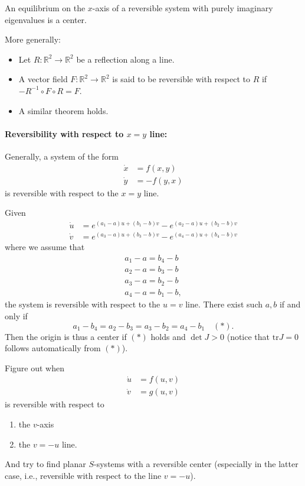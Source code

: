 \documentclass{article}
\newcommand*{\R}{\mathbb{R}}
\newcommand*{\tr}{\text{tr}}
\begin{document}
\begin{thm}
    An equilibrium on the $x$-axis of a reversible system with purely imaginary eigenvalues is a center.
\end{thm}

More generally:
\begin{itemize}
    \item Let $R: \R^2\to \R^2$ be a reflection along a line.

    \item A vector field $F:\R^2\to \R^2$ is said to be reversible with respect to $R$ if $-R^{-1}\circ F\circ R = F$.

    \item A similar theorem holds.
\end{itemize}

\paragraph{Reversibility with respect to $x = y$ line:}

Generally, a system of the form
$$\begin{aligned}
    \dot x &= f(x,y)\\
    \dot y &= -f(y,x)
\end{aligned}$$
is reversible with respect to the $x=y$ line.

\begin{exam}
    Given
    $$\begin{aligned}
        \dot u &= e^{(a_1-a)u+(b_1-b)v}-e^{(a_2-a)u+(b_2-b)v}\\
        \dot v &= e^{(a_3-a)u+(b_3-b)v}-e^{(a_4-a)u+(b_4-b)v}
    \end{aligned}$$
    where we assume that
    $$\begin{aligned}
        a_1-a = b_4-b\\
        a_2-a = b_3-b\\
        a_3-a = b_2-b\\
        a_4-a = b_1-b,
    \end{aligned}$$
    the system is reversible with respect to the $u=v$ line. There exist such $a,b$ if and only if $$a_1-b_4=a_2-b_3 = a_3-b_2=a_4-b_1 \quad (*).$$
    Then the origin is thus a center if $(*)$ holds and $\det J > 0$ (notice that $\tr J=0$  follows automatically from $(*)$).
\end{exam}



\begin{hw}
    Figure out when
    $$\begin{aligned}
        \dot u &= f(u,v)\\
        \dot v &= g(u,v)
    \end{aligned}$$
    is reversible with respect to
    \begin{enumerate}
        \item the $v$-axis

        \item the $v=-u$ line.
    \end{enumerate}
    And try to find planar $S$-systems with a reversible center (especially in the latter case, i.e., reversible with respect to the line $v=-u$).
\end{hw}
\end{document}
